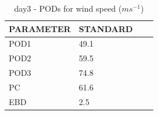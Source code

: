 \begin{table}[h!]
\begin{center}
\begin{tabular}{|l|l|l|l|}
\hline
\multicolumn{1}{|c|}{\cellcolor[HTML]{C0C0C0}\textbf{PARAMETER}} & \multicolumn{1}{c|}{\cellcolor[HTML]{C0C0C0}\textbf{STANDARD}} \\
\hline
\cellcolor[HTML]{C0C0C0}POD1  & 49.1                                \\
\cellcolor[HTML]{C0C0C0}POD2  & 59.5                                \\
\cellcolor[HTML]{C0C0C0}POD3  & 74.8                                \\
\cellcolor[HTML]{C0C0C0}PC    & 61.6                                  \\
\cellcolor[HTML]{C0C0C0}EBD   & 2.5                                 \\
\hline
\end{tabular}
\caption{day3 - PODs for wind speed ($m s^{-1}$)}
\label{tab:podws:day3}
\end{center}
\end{table}
